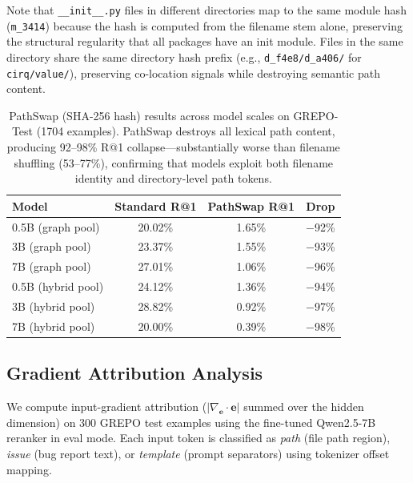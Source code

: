 \documentclass{article}
\begin{document}
Note that \texttt{\_\_init\_\_.py} files in different directories map to the same module hash (\texttt{m\_3414}) because the hash is computed from the filename stem alone, preserving the structural regularity that all packages have an init module.
Files in the same directory share the same directory hash prefix (e.g., \texttt{d\_f4e8/d\_a406/} for \texttt{cirq/value/}), preserving co-location signals while destroying semantic path content.

\begin{table}[h]
\centering
\caption{PathSwap (SHA-256 hash) results across model scales on GREPO-Test (1704 examples). PathSwap destroys all lexical path content, producing 92--98\% R@1 collapse---substantially worse than filename shuffling (53--77\%), confirming that models exploit both filename identity and directory-level path tokens.}
\label{tab:pathswap_scale}
\small
\begin{tabular}{lccc}
\toprule
\textbf{Model} & \textbf{Standard R@1} & \textbf{PathSwap R@1} & \textbf{Drop} \\
\midrule
0.5B (graph pool) & 20.02\% & 1.65\% & $-$92\% \\
3B (graph pool) & 23.37\% & 1.55\% & $-$93\% \\
7B (graph pool) & 27.01\% & 1.06\% & $-$96\% \\
\midrule
0.5B (hybrid pool) & 24.12\% & 1.36\% & $-$94\% \\
3B (hybrid pool) & 28.82\% & 0.92\% & $-$97\% \\
7B (hybrid pool) & 20.00\% & 0.39\% & $-$98\% \\
\bottomrule
\end{tabular}
\end{table}

\subsection{Gradient Attribution Analysis}
\label{app:gradient_attribution}

We compute input-gradient attribution ($|\nabla_{\mathbf{e}} \cdot \mathbf{e}|$ summed over the hidden dimension) on 300 GREPO test examples using the fine-tuned Qwen2.5-7B reranker in eval mode.
Each input token is classified as \emph{path} (file path region), \emph{issue} (bug report text), or \emph{template} (prompt separators) using tokenizer offset mapping.
\end{document}
